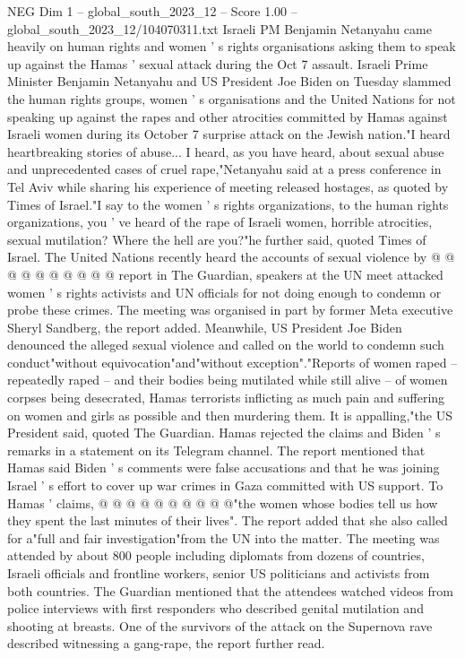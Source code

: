 \begin{textsample}{NEG Dim 1 – global\_south\_2023\_12 – Score 1.00 – global\_south\_2023\_12/104070311.txt}  \label{ex:f1_neg_411}
Israeli PM Benjamin Netanyahu came heavily on human rights and women ' s rights organisations asking them to speak up against the Hamas ' sexual attack during the Oct 7 assault.
Israeli Prime Minister Benjamin Netanyahu and US President Joe Biden on Tuesday slammed the human rights groups, women ' s organisations and the United Nations for not speaking up against the rapes and other atrocities committed by Hamas against Israeli women during its October 7 surprise attack on the Jewish nation."I heard heartbreaking stories of abuse...
I heard, as you have heard, about sexual abuse and unprecedented cases of cruel rape,"Netanyahu said at a press conference in Tel Aviv while sharing his experience of meeting released hostages, as quoted by Times of Israel."I say to the women ' s rights organizations, to the human rights organizations, you ' ve heard of the rape of Israeli women, horrible atrocities, sexual mutilation?
Where the hell are you?"he further said, quoted Times of Israel.
The United Nations recently heard the accounts of sexual violence by @ @ @ @ @ @ @ @ @ @ report in The Guardian, speakers at the UN meet attacked women ' s rights activists and UN officials for not doing enough to condemn or probe these crimes.
The meeting was organised in part by former Meta executive Sheryl Sandberg, the report added.
Meanwhile, US President Joe Biden denounced the alleged sexual violence and called on the world to condemn such conduct"without equivocation"and"without exception"."Reports of women raped -- repeatedly raped -- and their bodies being mutilated while still alive -- of women corpses being desecrated, Hamas terrorists inflicting as much pain and suffering on women and girls as possible and then murdering them.
It is appalling,"the US President said, quoted The Guardian.
Hamas rejected the claims and Biden ' s remarks in a statement on its Telegram channel.
The report mentioned that Hamas said Biden ' s comments were false accusations and that he was joining Israel ' s effort to cover up war crimes in Gaza committed with US support.
To Hamas ' claims, @ @ @ @ @ @ @ @ @ @"the women whose bodies tell us how they spent the last minutes of their lives".
The report added that she also called for a"full and fair investigation"from the UN into the matter.
The meeting was attended by about 800 people including diplomats from dozens of countries, Israeli officials and frontline workers, senior US politicians and activists from both countries.
The Guardian mentioned that the attendees watched videos from police interviews with first responders who described genital mutilation and shooting at breasts.
One of the survivors of the attack on the Supernova rave described witnessing a gang-rape, the report further read.

\end{textsample}
